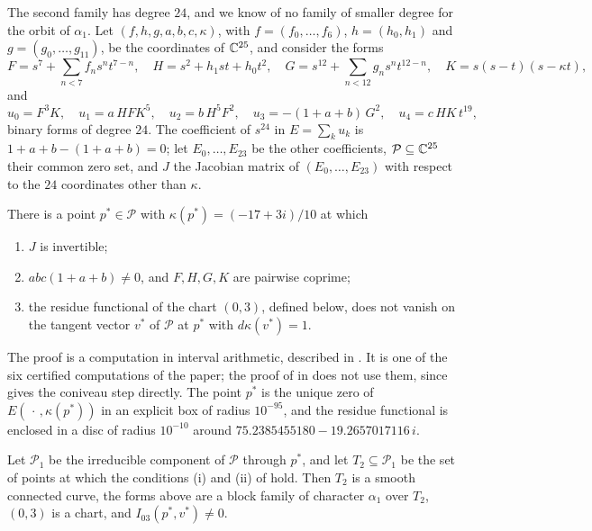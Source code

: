 The second family has degree $24$, and we know of no family of smaller
degree for the orbit of $\alpha_{1}$. Let $(f,h,g,a,b,c,\kappa)$, with
$f=(f_{0},\dots,f_{6})$, $h=(h_{0},h_{1})$ and $g=(g_{0},\dots,g_{11})$, be
the coordinates of $\mathbb{C}^{25}$, and consider the forms
\[
  F=s^{7}+\sum_{n<7}f_{n}s^{n}t^{7-n},\quad H=s^{2}+h_{1}st+h_{0}t^{2},\quad
  G=s^{12}+\sum_{n<12}g_{n}s^{n}t^{12-n},\quad K=s(s-t)(s-\kappa t),
\]
and
\[
  u_{0}=F^{3}K,\quad u_{1}=a\,HFK^{5},\quad u_{2}=b\,H^{5}F^{2},\quad
  u_{3}=-(1+a+b)\,G^{2},\quad u_{4}=c\,HK\,t^{19},
\]
binary forms of degree $24$. The coefficient of $s^{24}$ in
$E=\sum_{k}u_{k}$ is $1+a+b-(1+a+b)=0$; let $E_{0},\dots,E_{23}$ be the
other coefficients, $\mathcal P\subseteq\mathbb{C}^{25}$ their common zero set, and
$J$ the Jacobian matrix of $(E_{0},\dots,E_{23})$ with respect to the
$24$ coordinates other than $\kappa$.

\begin{proposition}\label{prop:family2}
There is a point $p^{*}\in\mathcal P$ with $\kappa(p^{*})=(-17+3i)/10$ at
which
\begin{enumerate}[label=\textup{(\roman*)}]
\item $J$ is invertible;
\item $abc(1+a+b)\ne0$, and $F,H,G,K$ are pairwise coprime;
\item the residue functional of the chart $(0,3)$, defined below, does not
vanish on the tangent vector $v^{*}$ of $\mathcal P$ at $p^{*}$ with
$d\kappa(v^{*})=1$.
\end{enumerate}
\end{proposition}

The proof is a computation in interval arithmetic, described in
. It is one of the six certified computations of the
paper; the proof of  in  does not
use them, since  gives the coniveau step directly. The point $p^{*}$ is the unique zero of $E(\,\cdot\,,\kappa(p^{*}))$
in an explicit box of radius $10^{-95}$, and the residue functional is
enclosed in a disc of radius $10^{-10}$ around
$75.2385455180-19.2657017116\,i$.

\begin{corollary}\label{cor:family2}
Let $\mathcal P_{1}$ be the irreducible component of $\mathcal P$ through
$p^{*}$, and let $T_{2}\subseteq\mathcal P_{1}$ be the set of points at which
the conditions \textup{(i)} and \textup{(ii)} of  hold.
Then $T_{2}$ is a smooth connected curve, the forms above are a block family
of character $\alpha_{1}$ over $T_{2}$, $(0,3)$ is a chart, and
$I_{03}(p^{*},v^{*})\ne0$.
\end{corollary}

